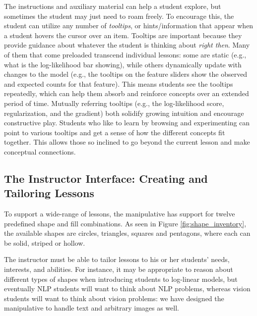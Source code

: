 \documentclass[11pt,letterpaper]{article}
\begin{document}
The instructions and auxiliary material can help a student explore, but sometimes the 
student may just need to roam freely. To encourage this, the student can utilize any number of 
\textit{tooltips}, or hints/information that appear when a student hovers the cursor over an item. 
Tooltips are important because they provide guidance about whatever the student is thinking about \textit{right then}.
Many of them that come preloaded transcend individual lessons: some are static (e.g., what is the 
log-likelihood bar showing), while others 
dynamically update with changes to the model (e.g., the tooltips on the feature sliders show the 
observed and expected counts for that feature).  
This means students see the tooltips repeatedly, which can help them absorb and reinforce concepts over an extended 
period of time. Mutually referring tooltips (e.g., the log-likelihood score, regularization, and the 
gradient) both solidify growing intuition and encourage constructive play. Students who like to learn by
browsing and experimenting can point to various tooltips and get a sense of how the different 
concepts fit together. This allows those so inclined to go beyond the current lesson and make conceptual 
connections.

\subsection{The Instructor Interface: Creating and Tailoring Lessons}\label{sec:tailoring}

To support a wide-range of lessons, the manipulative has support for twelve predefined shape and fill combinations.
As seen in Figure \ref{fig:shape_inventory}, the available shapes are circles, triangles, squares and pentagons,
where each can be solid, striped or hollow.

The instructor must be able to tailor lessons to his or her students' needs, 
interests, and abilities. For instance, it may be appropriate to reason about different types of shapes
when introducing students to log-linear models, but eventually NLP students will want to think about 
NLP problems, whereas vision students will want to think about vision problems: we have designed the manipulative to handle text
and arbitrary images as well.
\end{document}
